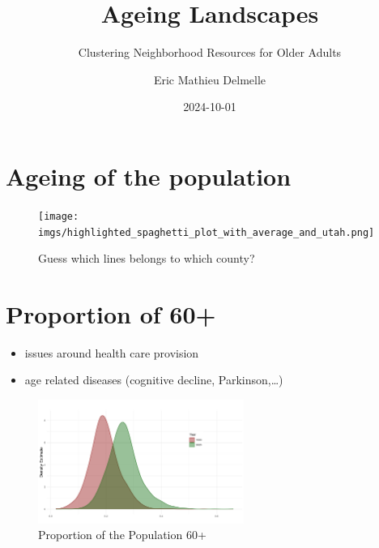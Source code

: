 \documentclass[
  letterpaper,
  DIV=11,
  numbers=noendperiod]{scrartcl}
\title{Ageing Landscapes}
\subtitle{Clustering Neighborhood Resources for Older Adults}
\author{Eric Mathieu Delmelle}
\date{2024-10-01}
\providecommand{\tightlist}{%
  \setlength{\itemsep}{0pt}\setlength{\parskip}{0pt}}\usepackage{longtable,booktabs,array}
\renewcommand*\contentsname{Table of contents}
\newcommand\contentsname{Table of contents}
\begin{document}
\maketitle
\ifdefined\Shaded\renewenvironment{Shaded}{\begin{tcolorbox}[enhanced, breakable, interior hidden, boxrule=0pt, sharp corners, borderline west={3pt}{0pt}{shadecolor}, frame hidden]}{\end{tcolorbox}}\fi

\renewcommand*\contentsname{Table of contents}
{
\hypersetup{linkcolor=}
\setcounter{tocdepth}{3}
\tableofcontents
}
\hypertarget{ageing-of-the-population}{%
\section{Ageing of the population}\label{ageing-of-the-population}}

\begin{figure}

{\centering \texttt{[image: imgs/highlighted\_spaghetti\_plot\_with\_average\_and\_utah.png]}

}

\caption{Guess which lines belongs to which county?}

\end{figure}

\hypertarget{proportion-of-60}{%
\section{Proportion of 60+}\label{proportion-of-60}}

\begin{itemize}
\tightlist
\item
  issues around health care provision
\item
  age related diseases (cognitive decline, Parkinson,\ldots)
\end{itemize}

\begin{figure}

{\centering \includegraphics[width=0.6\textwidth,height=\textheight]{imgs/ksdensity_60plus_comparison.png}

}

\caption{Proportion of the Population 60+}

\end{figure}
\end{document}
